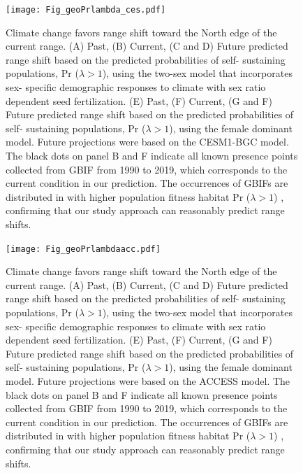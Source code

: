\documentclass[9pt,twoside,lineno]{pnas-new}
\begin{document}
\begin{figure}
\centering
\texttt{[image: Fig\_geoPrlambda\_ces.pdf]}
\caption{Climate change favors range shift toward the North edge of the current range.
			(A) Past, (B) Current, (C and D) Future predicted range shift based on the predicted probabilities of self- sustaining populations, Pr ($\lambda > 1$), using the two-sex model that incorporates sex- specific demographic responses to climate with sex ratio dependent seed fertilization.
			(E) Past, (F) Current, (G and F) Future  predicted range shift based on the predicted probabilities of self- sustaining populations, Pr ($\lambda > 1$), using the female dominant model.
			Future projections were based on the CESM1-BGC model.
			The black dots on panel B and F indicate all known presence points collected from GBIF from 1990 to 2019, which corresponds to the current condition in our prediction. 
			The occurrences of GBIFs are distributed in with higher population fitness habitat Pr ($\lambda > 1$) , confirming that our study approach can reasonably predict range shifts. }
\label{Sup:geoprojces}
\end{figure}
\clearpage


\begin{figure}
\centering
\texttt{[image: Fig\_geoPrlambdaacc.pdf]}
\caption{Climate change favors range shift toward the North edge of the current range.
			(A) Past, (B) Current, (C and D) Future predicted range shift based on the predicted probabilities of self- sustaining populations, Pr ($\lambda > 1$), using the two-sex model that incorporates sex- specific demographic responses to climate with sex ratio dependent seed fertilization.
			(E) Past, (F) Current, (G and F) Future  predicted range shift based on the predicted probabilities of self- sustaining populations, Pr ($\lambda > 1$), using the female dominant model.
			Future projections were based on the  ACCESS model.
			The black dots on panel B and F indicate all known presence points collected from GBIF from 1990 to 2019, which corresponds to the current condition in our prediction. 
			The occurrences of GBIFs are distributed in with higher population fitness habitat Pr ($\lambda > 1$) , confirming that our study approach can reasonably predict range shifts.}
\label{Sup:geoprojacc}
\end{figure}
\clearpage
\end{document}
